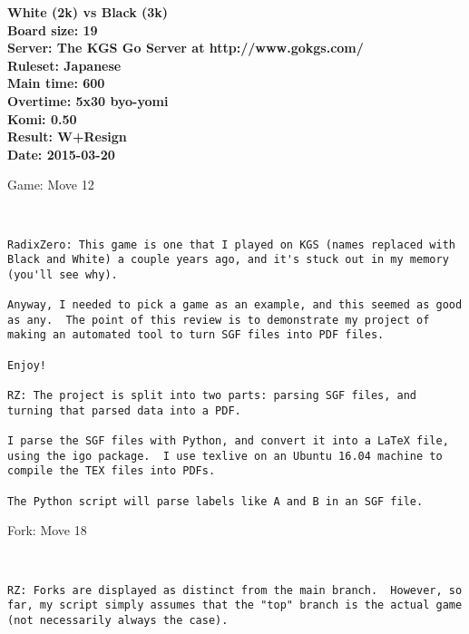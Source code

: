 \documentclass{article}
\begin{document}
\begin{titlepage}
    \null
    \vfill
    \begin{center}
        \textbf{White (2k) vs Black (3k)}\\
        \textbf{Board size: 19}\\
        \textbf{Server: The KGS Go Server at http://www.gokgs.com/}\\
        \textbf{Ruleset: Japanese}\\
        \textbf{Main time: 600}\\
        \textbf{Overtime: 5x30 byo-yomi}\\
        \textbf{Komi: 0.50}\\
        \textbf{Result: W+Resign}\\
        \textbf{Date: 2015-03-20}
    \end{center}
    \vfill
\end{titlepage}
\newpage
\tableofcontents
\newpage
\begin{section}{Game: Move 12}
\begin{center}
\cleargoban
{}
\showfullgoban
\\\begin{lstlisting}
RadixZero: This game is one that I played on KGS (names replaced with Black and White) a couple years ago, and it's stuck out in my memory (you'll see why).

Anyway, I needed to pick a game as an example, and this seemed as good as any.  The point of this review is to demonstrate my project of making an automated tool to turn SGF files into PDF files.

Enjoy!

RZ: The project is split into two parts: parsing SGF files, and turning that parsed data into a PDF.

I parse the SGF files with Python, and convert it into a LaTeX file, using the igo package.  I use texlive on an Ubuntu 16.04 machine to compile the TEX files into PDFs.

The Python script will parse labels like A and B in an SGF file.\end{lstlisting}
\end{center}
\end{section}
\begin{subsection}{Fork: Move 18}
\begin{center}
\cleargoban
{}
\showfullgoban
\\\begin{lstlisting}
RZ: Forks are displayed as distinct from the main branch.  However, so far, my script simply assumes that the "top" branch is the actual game (not necessarily always the case).\end{lstlisting}
\end{center}
\end{subsection}
\end{document}
